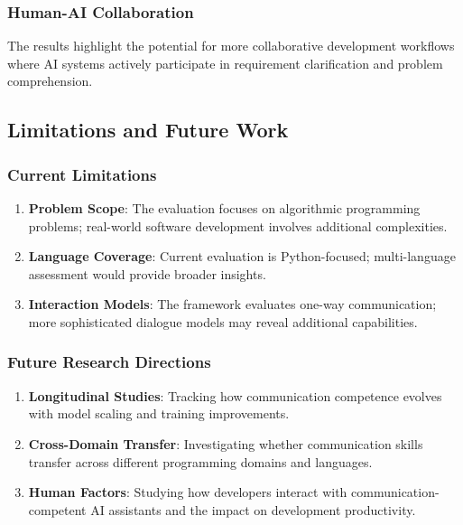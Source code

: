 \documentclass[conference]{IEEEtran}
\begin{document}
\subsubsection{Human-AI Collaboration}

The results highlight the potential for more collaborative development workflows where AI systems actively participate in requirement clarification and problem comprehension.

\subsection{Limitations and Future Work}

\subsubsection{Current Limitations}

\begin{enumerate}
    \item \textbf{Problem Scope}: The evaluation focuses on algorithmic programming problems; real-world software development involves additional complexities.
    \item \textbf{Language Coverage}: Current evaluation is Python-focused; multi-language assessment would provide broader insights.
    \item \textbf{Interaction Models}: The framework evaluates one-way communication; more sophisticated dialogue models may reveal additional capabilities.
\end{enumerate}

\subsubsection{Future Research Directions}

\begin{enumerate}
    \item \textbf{Longitudinal Studies}: Tracking how communication competence evolves with model scaling and training improvements.
    \item \textbf{Cross-Domain Transfer}: Investigating whether communication skills transfer across different programming domains and languages.
    \item \textbf{Human Factors}: Studying how developers interact with communication-competent AI assistants and the impact on development productivity.
\end{enumerate}
\end{document}
